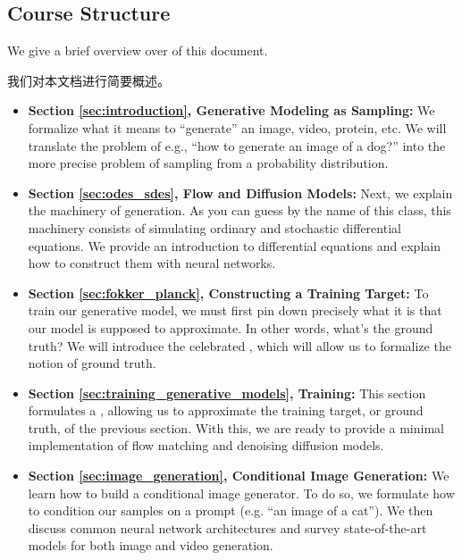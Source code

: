 \subsection{Course Structure}

We give a brief overview over of this document.

我们对本文档进行简要概述。
\begin{itemize}
\item \textbf{\sffamily Section \ref{sec:introduction}, Generative Modeling as Sampling:} We formalize what it means to ``generate'' an image, video, protein, etc. We will translate the problem of e.g., ``how to generate an image of a dog?'' into the more precise problem of sampling from a probability distribution.
\item \textbf{\sffamily Section \ref{sec:odes_sdes}, Flow and Diffusion Models:} Next, we explain the machinery of generation. As you can guess by the name of this class, this machinery consists of simulating ordinary and stochastic differential equations. We provide an introduction to differential equations and explain how to construct them with neural networks. 
\item \textbf{\sffamily Section \ref{sec:fokker_planck}, Constructing a Training Target:} To train our generative model, we must first pin down precisely what it is that our model is supposed to approximate. In other words, what's the ground truth? We will introduce the celebrated , which will allow us to formalize the notion of ground truth.
\item \textbf{\sffamily Section \ref{sec:training_generative_models}, Training:} This section formulates a , allowing us to approximate the training target, or ground truth, of the previous section. With this, we are ready to provide a minimal implementation of flow matching and denoising diffusion models.
\item \textbf{\sffamily Section \ref{sec:image_generation}, Conditional Image Generation:} We learn how to build a conditional image generator. To do so, we formulate how to condition our samples on a prompt (e.g. ``an image of a cat''). We then discuss common neural network architectures and survey state-of-the-art models for both image and video generation.
\end{itemize}

